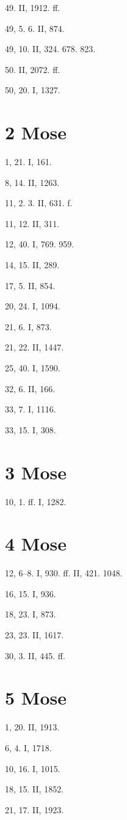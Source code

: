 49. II, 1912. ff.

49, 5. 6. II, 874.

49, 10. II, 324. 678. 823.

50. II, 2072. ff.

50, 20. I, 1327.

\section{2 Mose}

1, 21. I, 161.

8, 14. II, 1263.

11, 2. 3. II, 631. f.

11, 12. II, 311.

12, 40. I, 769. 959.

14, 15. II, 289.

17, 5. II, 854.

20, 24. I, 1094.

21, 6. I, 873.

21, 22. II, 1447.

25, 40. I, 1590.

32, 6. II, 166.

33, 7. I, 1116.

33, 15. I, 308.

\section{3 Mose}

10, 1. ff. I, 1282.

\section{4 Mose}

12, 6–8. I, 930. ff. II, 421. 1048.

16, 15. I, 936.

18, 23. I, 873.

23, 23. II, 1617.

30, 3. II, 445. ff.

\section{5 Mose}

1, 20. II, 1913.

6, 4. I, 1718.

10, 16. I, 1015.

18, 15. II, 1852.

21, 17. II, 1923.


